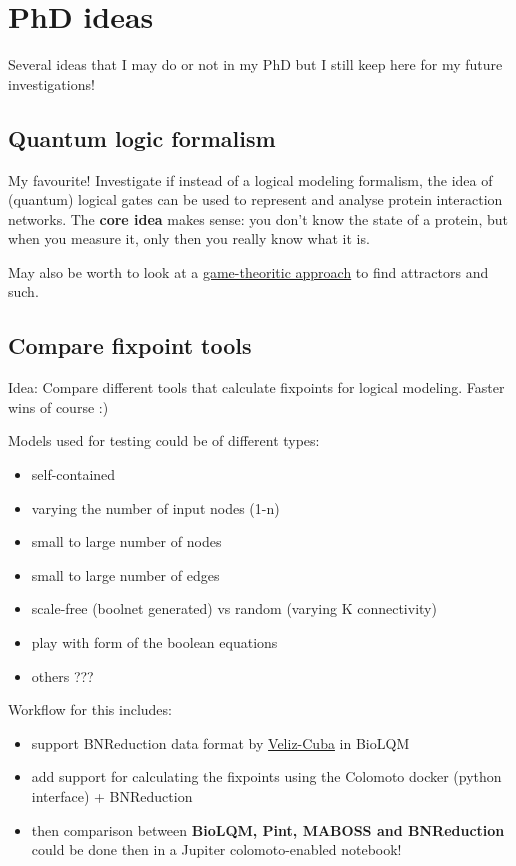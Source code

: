 \documentclass[12pt,]{book}
\providecommand{\tightlist}{%
  \setlength{\itemsep}{0pt}\setlength{\parskip}{0pt}}
\begin{document}
\hypertarget{ideas}{%
\chapter{PhD ideas}\label{ideas}}

Several ideas that I may do or not in my PhD but I still keep here for my future
investigations!

\hypertarget{quantum}{%
\section{Quantum logic formalism}\label{quantum}}

My favourite! Investigate if instead of a logical modeling formalism, the idea
of (quantum) logical gates can be used to represent and analyse protein interaction
networks.
The \textbf{core idea} makes sense: you don't know the state of a protein, but when
you measure it, only then you really know what it is.

May also be worth to look at a \href{https://doi.org/10.1007/11885191_18}{game-theoritic approach}
to find attractors and such.

\hypertarget{comp}{%
\section{Compare fixpoint tools}\label{comp}}

Idea: Compare different tools that calculate fixpoints for logical modeling.
Faster wins of course :)

Models used for testing could be of different types:

\begin{itemize}
\tightlist
\item
  self-contained
\item
  varying the number of input nodes (1-n)
\item
  small to large number of nodes
\item
  small to large number of edges
\item
  scale-free (boolnet generated) vs random (varying K connectivity)
\item
  play with form of the boolean equations
\item
  others ???
\end{itemize}

Workflow for this includes:

\begin{itemize}
\tightlist
\item
  support BNReduction data format by \href{https://doi.org/10.1186/1471-2105-15-221}{Veliz-Cuba}
  in BioLQM
\item
  add support for calculating the fixpoints using the Colomoto docker (python
  interface) + BNReduction
\item
  then comparison between \textbf{BioLQM, Pint, MABOSS and BNReduction} could be done then
  in a Jupiter colomoto-enabled notebook!
\end{itemize}
\end{document}

